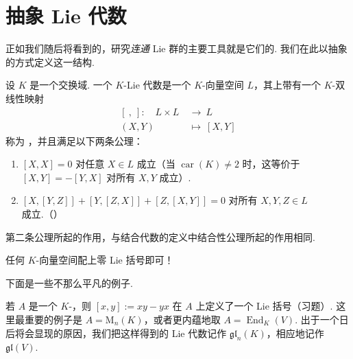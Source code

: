 \section{抽象 Lie 代数}\label{sec:lie-1-4}

正如我们随后将看到的，研究\emph{连通} Lie 群的主要工具就是它们的. 我们在此以抽象的方式定义这一结构.

\begin{definition}\label{def:lie-1-4-1}
设 $K$ 是一个交换域. 一个 $K$-Lie 代数是一个 $K$-向量空间 $L$，其上带有一个 $K$-双线性映射
\[
\begin{aligned}
[\ ,\ ]:\quad L\times L\ &\longrightarrow\ L\\
(X,Y)\ &\longmapsto\ [X,Y]
\end{aligned}
\]
称为 ，并且满足以下两条公理：
\begin{enumerate}[label=\roman*)]
\item $[X,X]=0$ 对任意 $X\in L$ 成立（当 $\operatorname{car}(K)\neq 2$ 时，这等价于 $[X,Y]=-[Y,X]$ 对所有 $X,Y$ 成立）.
\item $[X,[Y,Z]]+[Y,[Z,X]]+[Z,[X,Y]]=0$ 对所有 $X,Y,Z\in L$ 成立.（）
\end{enumerate}
\end{definition}

\begin{remark*}
第二条公理所起的作用，与结合代数的定义中结合性公理所起的作用相同.
\end{remark*}

\begin{example*}
任何 $K$-向量空间配上零 Lie 括号即可！
\end{example*}

下面是一些不那么平凡的例子.

\begin{numpara}\label{np:lie-1-4-2}
若 $A$ 是一个 $K$-，则 $[x,y]:=xy-yx$ 在 $A$ 上定义了一个 Lie 括号（习题）. 这里最重要的例子是 $A=\mathrm{M}_n(K)$，或者更内蕴地取 $A=\operatorname{End}_K(V)$. 出于一个日后将会显现的原因，我们把这样得到的 Lie 代数记作 $\mathfrak{gl}_n(K)$，相应地记作 $\mathfrak{gl}(V)$.
\end{numpara}

